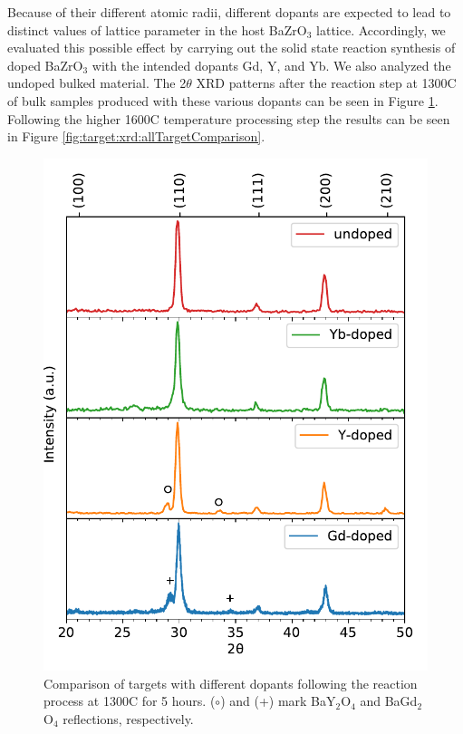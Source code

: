 Because of their different atomic radii, different dopants are expected to lead to distinct values of lattice parameter in the host BaZrO$_3$ lattice. Accordingly, we evaluated this possible effect by carrying out the solid state reaction synthesis of doped BaZrO$_3$ with the intended dopants Gd, Y, and Yb. We also analyzed the undoped bulked material. The 2$\theta$ XRD patterns after the reaction step at 1300\textdegree C of bulk samples produced with these various dopants can be seen in Figure \ref{fig:target:xrd:reaction:dopants}. Following the higher 1600\textdegree C temperature processing step the results can be seen in Figure \ref{fig:target:xrd:allTargetComparison}. 

\begin{figure}
    \centering
    \includegraphics{Figures/xrd-pellet-dopant-comparison.pdf}
    \caption{Comparison of targets with different dopants following the reaction process at 1300\textdegree C for 5 hours. ($\circ$) and (+) mark BaY$_2$O$_4$ and BaGd$_2$O$_4$ reflections, respectively.}
    \label{fig:target:xrd:reaction:dopants}
\end{figure}

